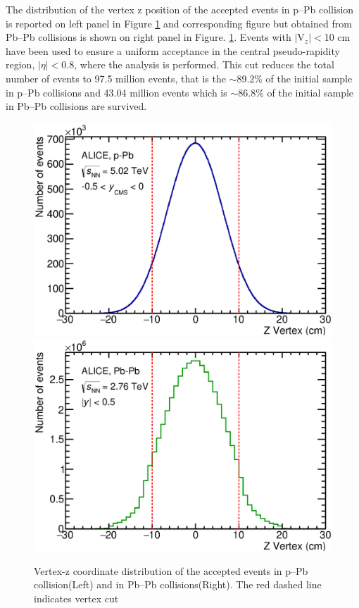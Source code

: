 The distribution of the vertex z position of the accepted events in p--Pb collision is reported on left panel in Figure \ref{fig:VzDistribution} and corresponding figure but obtained from Pb--Pb collisions is shown on right panel in Figure. \ref{fig:VzDistribution}. Events with $|$V$_{z}|<$10 cm have been used to ensure a uniform acceptance in the central pseudo-rapidity region, $|\eta|<$0.8, where the analysis is performed. This cut reduces the total number of events to 97.5 million events, that is the $\sim$89.2\% of the initial sample in p--Pb collisions and 43.04 million events which is $\sim$86.8\% of the initial sample in Pb--Pb collisions are survived.


\begin{figure}[htbp]
\begin{center}
\includegraphics[width=7.cm]{./Version1/FigChapter5/Selection/pPbVertexZ.eps}
\hspace{0.5cm}
\includegraphics[width=7.cm]{./Version1/FigChapter5/Selection/PbPbVertexZ.eps}
\caption{Vertex-z coordinate distribution of the accepted events in p--Pb collision(Left) and in Pb--Pb collisions(Right). The red dashed line indicates vertex cut }
\label{fig:VzDistribution}
\end{center}
\end{figure}

